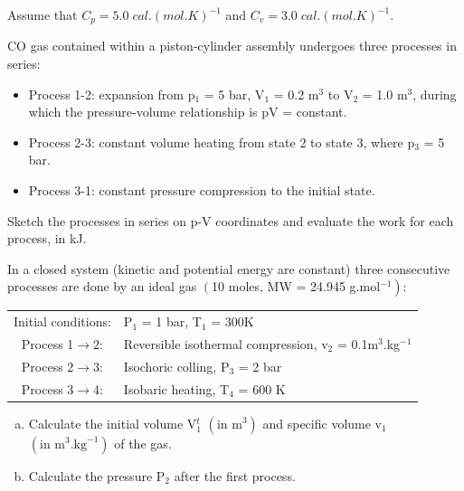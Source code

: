 \begin{MyTutorial}{}
\begin{problem}
\begin{enumerate}[a)]
     \end{enumerate}
     Assume that $C_{p}= 5.0\; cal.\left(mol.K\right)^{-1}$ and $C_{v}=3.0\; cal.\left(mol.K\right)^{-1}$.
  \end{problem}
%
  \begin{problem}\label{Chapter:SecondLaw:Problem:03}\citep{Moran_Book} %
      CO gas contained within a piston-cylinder assembly undergoes three processes in series:
     \begin{itemize}
        \item Process 1-2: expansion from p$_{1}$ = 5 bar, V$_{1}$ = 0.2 m$^{3}$ to V$_{2}$ = 1.0 m$^{3}$, during which the pressure-volume relationship is pV = constant.
        \item Process 2-3: constant volume heating from state 2 to state 3, where p$_{3}$ = 5 bar.
        \item Process 3-1: constant pressure compression to the initial state.
     \end{itemize}
     Sketch the processes in series on p-V coordinates and evaluate the work for each process, in kJ.
  \end{problem}
%
  \begin{problem}\label{Chapter:SecondLaw:Problem:04} %
     In a closed system (kinetic and potential energy are constant) three consecutive processes are done by an ideal gas $\left(\right.$10 moles, MW = 24.945 g.mol$\left.^{-1}\right)$:
     \begin{center}
        \begin{tabular}{c l}
          \hline
          Initial conditions: & P$_{1}$ = 1 bar, T$_{1}$ = 300K \\
          Process 1$\rightarrow$2: & Reversible isothermal compression, v$_{2}$ = 0.1m$^{3}$.kg$^{-1}$ \\
          Process 2$\rightarrow$3: & Isochoric colling, P$_{3}$ = 2 bar \\
          Process 3$\rightarrow$4: & Isobaric heating, T$_{4}$ = 600 K \\
          \hline
        \end{tabular}
     \end{center}
     \begin{enumerate}[a)]  
        \item Calculate the initial volume V$^{t}_{1}$ $\left(\text{in m}^{3}\right)$ and specific volume v$_{1}$ $\left(\text{in m}^{3}\text{.kg}^{-1}\right)$ of the gas.%
        \item Calculate the pressure P$_{2}$ after the first process. %

\end{enumerate}
\end{problem}
\end{MyTutorial}
